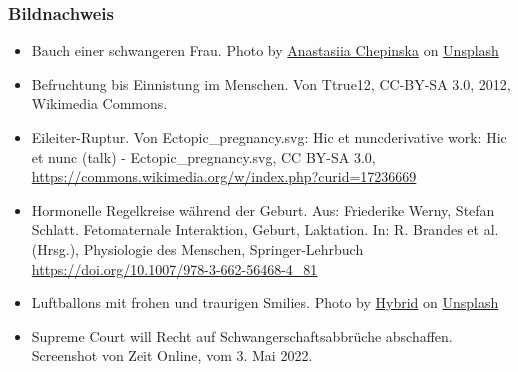 \documentclass{beamer}
\begin{document}
\begin{frame}
\frametitle{Bildnachweis}

\begin{tiny}
 
\begin{itemize}


\item
Bauch einer schwangeren Frau. Photo by \href{https://unsplash.com/es/@anastasiiachepinska?utm_source=unsplash&utm_medium=referral&utm_content=creditCopyText}{Anastasiia Chepinska} on \href{https://unsplash.com/s/photos/pregnancy?utm_source=unsplash&utm_medium=referral&utm_content=creditCopyText}{Unsplash}


\item
Befruchtung bis Einnistung im Menschen. Von Ttrue12, CC-BY-SA 3.0, 2012, Wikimedia Commons.

\item
Eileiter-Ruptur. Von Ectopic\_pregnancy.svg: Hic et nuncderivative work: Hic et nunc (talk) - Ectopic\_pregnancy.svg, CC BY-SA 3.0, \url{https://commons.wikimedia.org/w/index.php?curid=17236669}

\item
Hormonelle Regelkreise während der Geburt. Aus: Friederike Werny, Stefan Schlatt. Fetomaternale Interaktion, Geburt, Laktation. In: R. Brandes et al. (Hrsg.), Physiologie des Menschen, Springer-Lehrbuch \url{https://doi.org/10.1007/978-3-662-56468-4_81}


\item
Luftballons mit frohen und traurigen Smilies. Photo by \href{https://unsplash.com/@artbyhybrid?utm_source=unsplash&utm_medium=referral&utm_content=creditCopyText}{Hybrid} on \href{https://unsplash.com/s/photos/feedback?utm_source=unsplash&utm_medium=referral&utm_content=creditCopyText}{Unsplash}

\item
Supreme Court will Recht auf Schwangerschaftsabbrüche abschaffen. Screenshot von Zeit Online, vom 3. Mai 2022.
\end{itemize}
\end{tiny}
\end{frame}
\end{document}
